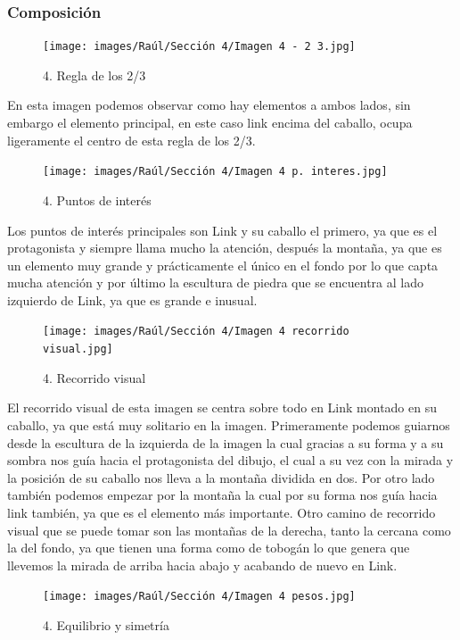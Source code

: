 \documentclass[12pt]{article}
\begin{document}
        \subsubsection{Composición}
        
\begin{figure}[H]
      \centering
      \texttt{[image: images/Raúl/Sección 4/Imagen 4 - 2 3.jpg]}
      \caption{\small 4. Regla de los 2/3}
\end{figure}  

En esta imagen podemos observar como hay elementos a ambos lados, sin embargo el elemento principal, en este caso link encima del caballo, ocupa ligeramente el centro de esta regla de los 2/3.

\begin{figure}[H]
      \centering
      \texttt{[image: images/Raúl/Sección 4/Imagen 4 p. interes.jpg]}
      \caption{\small 4. Puntos de interés}
\end{figure}  

Los puntos de interés principales son Link y su caballo el primero, ya que es el protagonista y siempre llama mucho la atención, después la montaña, ya que es un elemento muy grande y prácticamente el único en el fondo por lo que capta mucha atención y por último la escultura de piedra que se encuentra al lado izquierdo de Link, ya que es grande e inusual.

\begin{figure}[H]
      \centering
      \texttt{[image: images/Raúl/Sección 4/Imagen 4 recorrido visual.jpg]}
      \caption{\small 4. Recorrido visual}
\end{figure}  

El recorrido visual de esta imagen se centra sobre todo en Link montado en su caballo, ya que está muy solitario en la imagen. Primeramente podemos guiarnos desde la escultura de la izquierda de la imagen la cual gracias a su forma y a su sombra nos guía hacia el protagonista del dibujo, el cual a su vez con la mirada y la posición de su caballo nos lleva a la montaña dividida en dos. Por otro lado también podemos empezar por la montaña la cual por su forma nos guía hacia link también, ya que es el elemento más importante. Otro camino de recorrido visual que se puede tomar son las montañas de la derecha, tanto la cercana como la del fondo, ya que tienen una forma como de tobogán lo que genera que llevemos la mirada de arriba hacia abajo y acabando de nuevo en Link.

\begin{figure}[H]
      \centering
      \texttt{[image: images/Raúl/Sección 4/Imagen 4 pesos.jpg]}
      \caption{\small 4. Equilibrio y simetría}
\end{figure} 
\end{document}
